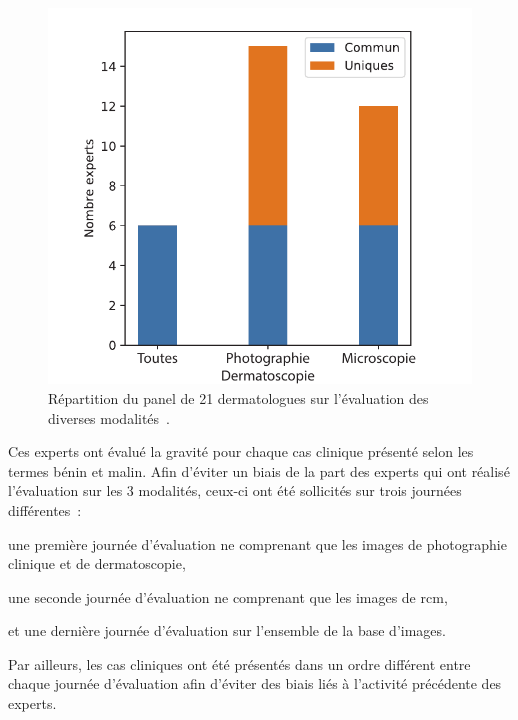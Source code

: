 \begin{figure}[H]
    \centering
    \includegraphics[width=0.6\linewidth]{contents/chapter_3_1/resources/experts_evaluation.pdf}
    \caption{Répartition du panel de 21 dermatologues sur l'évaluation des diverses modalités~\cite{Cinotti2018}.}
    \label{fig:experts_evaluation}
\end{figure}\par

Ces experts ont évalué la gravité pour chaque cas clinique présenté selon les termes bénin et malin. Afin d'éviter un biais de la part des experts qui ont réalisé l'évaluation sur les 3 modalités, ceux-ci ont été sollicités sur trois journées différentes~: 
\begin{inlinerate}
    \item une première journée d'évaluation ne comprenant que les images de photographie clinique et de dermatoscopie,
    \item une seconde journée d'évaluation ne comprenant que les images de \gls{rcm},
    \item et une dernière journée d'évaluation sur l'ensemble de la base d'images.
\end{inlinerate}
Par ailleurs, les cas cliniques ont été présentés dans un ordre différent entre chaque journée d'évaluation afin d'éviter des biais liés à l'activité précédente des experts.\par

